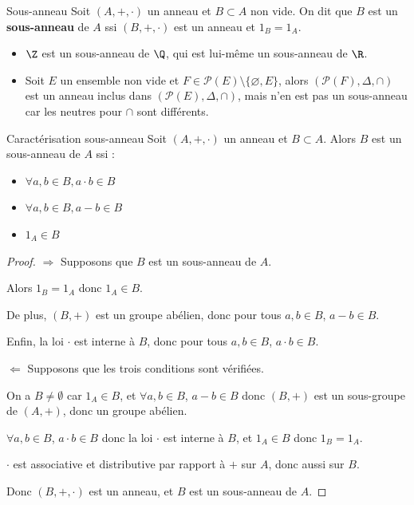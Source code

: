 \begin{definition}{Sous-anneau}{}
    Soit $(A, +, \cdot)$ un anneau et $B \subset A$ non vide. On dit que $B$ est un 
    \textbf{sous-anneau} de $A$ ssi $(B, +, \cdot)$ est un anneau et $1_B = 1_A$.
\end{definition}

\begin{exemple}
    \begin{itemize}
        \item $\Z$ est un sous-anneau de $\Q$, qui est lui-même un sous-anneau de $\R$.

        \item Soit $E$ un ensemble non vide et $F \in \mathscr P(E) \setminus \{\varnothing,E\}$, alors
        $(\mathscr{P}(F), \Delta, \cap)$ est un anneau inclus dans $(\mathscr{P}(E), \Delta, \cap)$,
        mais n'en est pas un sous-anneau car les neutres pour $\cap$ sont différents.  
    \end{itemize}
\end{exemple}

\begin{proposition}{Caractérisation sous-anneau}{}
    Soit $(A, +, \cdot)$ un anneau et $B \subset A$. Alors 
    $B$ est un sous-anneau de $A$ ssi : 
    \begin{itemize}
        \item $\forall a, b \in B, a \cdot b \in B$
        \item $\forall a, b \in B, a - b \in B$
        \item $1_A \in B$
    \end{itemize}    
\end{proposition}


\begin{proof}
    $\Rightarrow$ Supposons que $B$ est un sous-anneau de $A$.
    
    Alors $1_B = 1_A$ donc $1_A \in B$.

    De plus, $(B, +)$ est un groupe abélien, donc pour tous $a, b \in B$, $a - b \in B$.

    Enfin, la loi $\cdot$ est interne à $B$, donc pour tous $a, b \in B$, $a \cdot b \in B$.

    \avspace $\Leftarrow$ Supposons que les trois conditions sont vérifiées.

    On a $B \neq \emptyset$ car $1_A \in B$, et $\forall a, b \in B$, $a - b \in B$ donc $(B, +)$ est un sous-groupe de $(A, +)$,
    donc un groupe abélien.

    $\forall a, b \in B$, $a \cdot b \in B$ donc la loi $\cdot$ est interne à $B$, et 
    $1_A \in B$ donc $1_B = 1_A$.

    $\cdot$ est associative et distributive par rapport à $+$ sur $A$, donc aussi sur $B$.

    Donc $(B, +, \cdot)$ est un anneau, et $B$ est un sous-anneau de $A$.
\end{proof}

